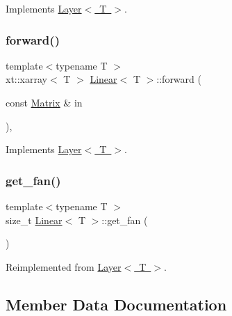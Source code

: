 Implements \mbox{\hyperlink{class_layer_ac4c13a3a85bfdd4d7d4d18669e3299fe}{Layer$<$ T $>$}}.

\mbox{\label{class_linear_a901668e9219a8d446b2ac60718b9c9f1}} 
\subsubsection{\texorpdfstring{forward()}{forward()}}
{\footnotesize\ttfamily template$<$typename T $>$ \\
xt\+::xarray$<$ T $>$ \mbox{\hyperlink{class_linear}{Linear}}$<$ T $>$\+::forward (\begin{DoxyParamCaption}\item[{const \mbox{\hyperlink{class_layer_a22b1e7286096aa62bd245536c8ebdaf1}{Matrix}} \&}]{in }\end{DoxyParamCaption})\hspace{0.3cm}{\ttfamily [override]}, {\ttfamily [virtual]}}



Implements \mbox{\hyperlink{class_layer_ab15b665c86974b1cf1d7ba4e309cb0e5}{Layer$<$ T $>$}}.

\mbox{\label{class_linear_a753a7cb02a0b18e8922d23db905eb534}} 
\subsubsection{\texorpdfstring{get\_fan()}{get\_fan()}}
{\footnotesize\ttfamily template$<$typename T $>$ \\
size\+\_\+t \mbox{\hyperlink{class_linear}{Linear}}$<$ T $>$\+::get\+\_\+fan (\begin{DoxyParamCaption}{ }\end{DoxyParamCaption})\hspace{0.3cm}{\ttfamily [virtual]}}



Reimplemented from \mbox{\hyperlink{class_layer_a43681206a2ef690667c41423b6b6f20b}{Layer$<$ T $>$}}.



\subsection{Member Data Documentation}
\mbox{\label{class_linear_ae15dad7b24bbc705da10f6896188ab13}} 
